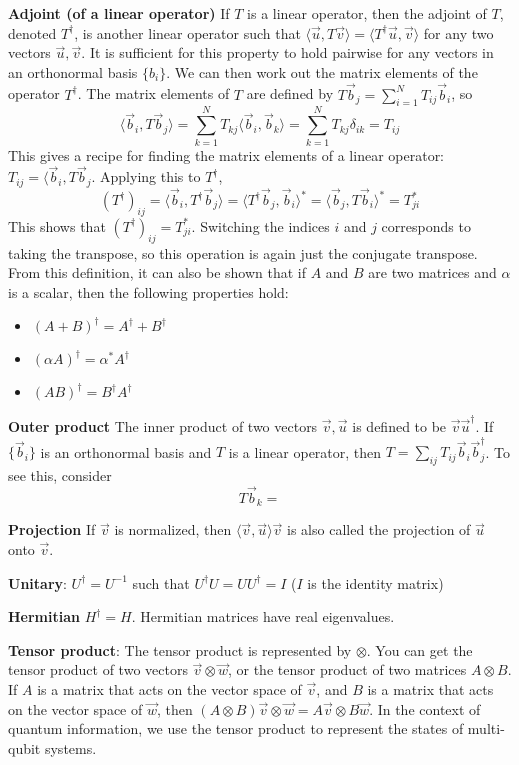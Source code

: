 \documentclass{article}
\begin{document}
\textbf{Adjoint (of a linear operator)}
If $T$ is a linear operator, then the adjoint of $T$, denoted $T^\dagger$, is another linear operator such that $\langle \vec u, T\vec v\rangle = \langle T^\dagger \vec u, \vec v\rangle$ for any two vectors $\vec u, \vec v$. It is sufficient for this property to hold pairwise for any vectors in an orthonormal basis $\{b_i\}$. We can then work out the matrix elements of the operator $T^\dagger$. The matrix elements of $T$ are defined by $T\vec b_j = \sum_{i=1}^N T_{ij}\vec b_i$, so 
$$
\langle \vec b_i, T\vec b_j\rangle = \sum_{k=1}^N T_{kj}\langle \vec b_i, \vec b_k\rangle = \sum_{k=1}^N T_{kj}\delta_{ik} = T_{ij}
$$
This gives a recipe for finding the matrix elements of a linear operator: $T_{ij} = \langle \vec b_i, T\vec b_j$. Applying this to $T^\dagger$,
$$
(T^\dagger)_{ij} = \langle \vec b_i, T^\dagger \vec b_j \rangle = \langle T^\dagger\vec b_j, \vec b_i \rangle^\ast = \langle \vec b_j, T\vec b_i \rangle^\ast = T_{ji}^\ast
$$
This shows that $(T^\dagger)_{ij} = T_{ji}^\ast$. Switching the indices $i$ and $j$ corresponds to taking the transpose, so this operation is again just the conjugate transpose. From this definition, it can also be shown that if $A$ and $B$ are two matrices and $\alpha$ is a scalar, then the following properties hold:
\begin{itemize}
    \item $(A+B)^\dagger = A^\dagger + B^\dagger$
    \item $(\alpha A)^\dagger = \alpha^\ast A^\dagger$
    \item $(AB)^\dagger = B^\dagger A^\dagger$
\end{itemize}
\textbf{Outer product}
The inner product of two vectors $\vec v, \vec u$ is defined to be $\vec v \vec u^\dagger$. If $\{\vec b_i\}$ is an orthonormal basis and $T$ is a linear operator, then $T = \sum_{ij}T_{ij}\vec b_i\vec b_j^\dagger$. To see this, consider
$$
T\vec b_k = 
$$
 
\textbf{Projection}
If $\vec v$ is normalized, then $\langle \vec v, \vec u\rangle\vec v$ is also called the projection of $\vec u$ onto $\vec v$.

\textbf{Unitary}: $U^\dagger=U^{-1}$ such that $U^\dagger U=U U^\dagger=I$ ($I$ is the identity matrix)

\textbf{Hermitian} $H^\dagger=H$. Hermitian matrices have real eigenvalues.

\textbf{Tensor product}: The tensor product is represented by $\otimes$. You can get the tensor product of two vectors $\vec{v}\otimes \vec{w}$, or the tensor product of two matrices $A\otimes B$. If $A$ is a matrix that acts on the vector space of $\vec{v}$, and $B$ is a matrix that acts on the vector space of $\vec{w}$, then $(A\otimes B)\vec{v}\otimes \vec{w}=A\vec{v}\otimes B\vec{w}$. 
In the context of quantum information, we use the tensor product to represent the states of multi-qubit systems.
\end{document}
